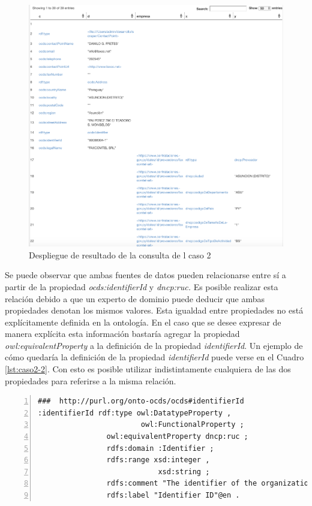  \begin{figure}[ht!]
    \centering
    \includegraphics[width=150mm]{figuras/caso2Resultado.png}
    \caption{Despliegue de resultado de la consulta de l caso 2}
    \label{img:caso2Resultado}
 \end{figure}


 Se puede observar que ambas fuentes de datos pueden relacionarse entre sí a partir de la propiedad \textit{ocds:identifierId} y \textit{dncp:ruc.} Es posible realizar esta relación debido a que un experto de dominio puede deducir que ambas propiedades denotan los mismos valores. Esta igualdad entre propiedades no está explícitamente definida en la ontología. En el caso que se desee expresar de manera explícita esta información bastaría agregar la propiedad \textit{owl:equivalentProperty} a la definición de la propiedad \textit{identifierId}. Un ejemplo de cómo quedaría la definición de la propiedad \textit{identifierId} puede verse en el Cuadro \ref{lst:caso2-2}. Con esto es posible utilizar indistintamente cualquiera de las dos propiedades para referirse a la misma relación.\hfill \break

\noindent\begin{minipage}{\textwidth}
 \begin{lstlisting}[captionpos=b, caption={Declaración de equivalencia semántica entre dncp:ruc y ocds:identifierID}, label=lst:caso2-2,  numbers=left,  numberstyle=\tiny\color{mygray},frame=single]
###  http://purl.org/onto-ocds/ocds#identifierId
:identifierId rdf:type owl:DatatypeProperty ,
                        owl:FunctionalProperty ;
                owl:equivalentProperty dncp:ruc ;
                rdfs:domain :Identifier ;
                rdfs:range xsd:integer ,
                            xsd:string ;
                rdfs:comment "The identifier of the organization in the selected scheme."@en ;
                rdfs:label "Identifier ID"@en .
 \end{lstlisting}
\end{minipage}

